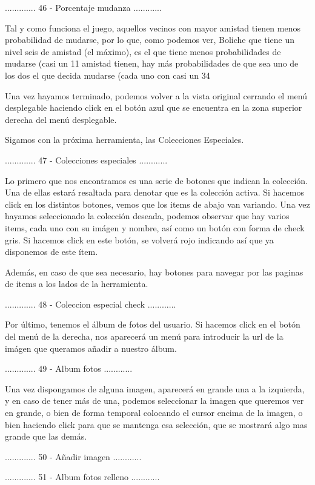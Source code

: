 ............. 46 - Porcentaje mudanza ............

Tal y como funciona el juego, aquellos vecinos con mayor amistad tienen menos probabilidad de mudarse,
por lo que, como podemos ver, Boliche que tiene un nivel seis de amistad (el máximo), es el que tiene
menos probabilidades de mudarse (casi un 11%
amistad tienen, hay más probabilidades de que sea uno de los dos el que decida mudarse (cada uno con
casi un 34%

Una vez hayamos terminado, podemos volver a la vista original cerrando el menú desplegable haciendo click
en el botón azul que se encuentra en la zona superior derecha del menú desplegable.

Sigamos con la próxima herramienta, las Colecciones Especiales.

............. 47 - Colecciones especiales ............

Lo primero que nos encontramos es una serie de botones que indican la colección. Una de ellas estará
resaltada para denotar que es la colección activa. Si hacemos click en los distintos botones, vemos
que los items de abajo van variando. Una vez hayamos seleccionado la colección deseada, podemos
observar que hay varios items, cada uno con su imágen y nombre, así como un botón con forma de check
gris. Si hacemos click en este botón, se volverá rojo indicando así que ya disponemos de este ítem.

Además, en caso de que sea necesario, hay botones para navegar por las paginas de items a los lados
de la herramienta.

............. 48 - Coleccion especial check ............

Por último, tenemos el álbum de fotos del usuario. Si hacemos click en el botón del menú de la derecha,
nos aparecerá un menú para introducir la url de la imágen que queramos añadir a nuestro álbum.

............. 49 - Album fotos ............

Una vez dispongamos de alguna imagen, aparecerá en grande una a la izquierda, y en caso de tener
más de una, podemos seleccionar la imagen que queremos ver en grande, o bien de forma temporal colocando
el cursor encima de la imagen, o bien haciendo click para que se mantenga esa selección, que se mostrará
algo mas grande que las demás.

............. 50 - Añadir imagen ............

............. 51 - Album fotos relleno ............

